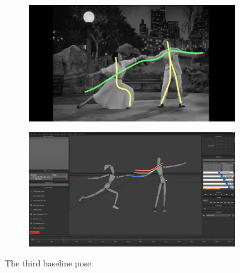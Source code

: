 \begin{figure}[h!]
	\centering
        \begin{subfigure}[b!]{0.45\textwidth}
        	\centering
                \includegraphics[width=\linewidth]{img/keyframe_case_7_(4)}
        \end{subfigure}
        \quad
        \begin{subfigure}[b!]{0.45\textwidth}
        	\centering
                \includegraphics[width=\linewidth]{img/baselinepose3}
        \end{subfigure}%
        \caption{The third baseline pose.}
	\label{fig:bpose3}
\end{figure}

